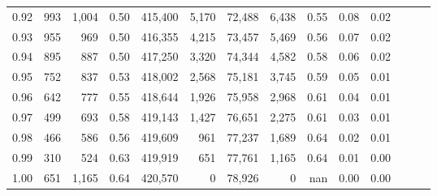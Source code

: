 \begin{tabular}{rrrrrrrrrrrrrr}
0.92 &    993 &  1,004 &  0.50 &  415,400 &    5,170 &  72,488 &   6,438 &  0.55 &  0.08 &      0.02 \\
0.93 &    955 &    969 &  0.50 &  416,355 &    4,215 &  73,457 &   5,469 &  0.56 &  0.07 &      0.02 \\
0.94 &    895 &    887 &  0.50 &  417,250 &    3,320 &  74,344 &   4,582 &  0.58 &  0.06 &      0.02 \\
0.95 &    752 &    837 &  0.53 &  418,002 &    2,568 &  75,181 &   3,745 &  0.59 &  0.05 &      0.01 \\
0.96 &    642 &    777 &  0.55 &  418,644 &    1,926 &  75,958 &   2,968 &  0.61 &  0.04 &      0.01 \\
0.97 &    499 &    693 &  0.58 &  419,143 &    1,427 &  76,651 &   2,275 &  0.61 &  0.03 &      0.01 \\
0.98 &    466 &    586 &  0.56 &  419,609 &      961 &  77,237 &   1,689 &  0.64 &  0.02 &      0.01 \\
0.99 &    310 &    524 &  0.63 &  419,919 &      651 &  77,761 &   1,165 &  0.64 &  0.01 &      0.00 \\
1.00 &    651 &  1,165 &  0.64 &  420,570 &        0 &  78,926 &       0 &   nan &  0.00 &      0.00 \\
\bottomrule
\end{tabular}
